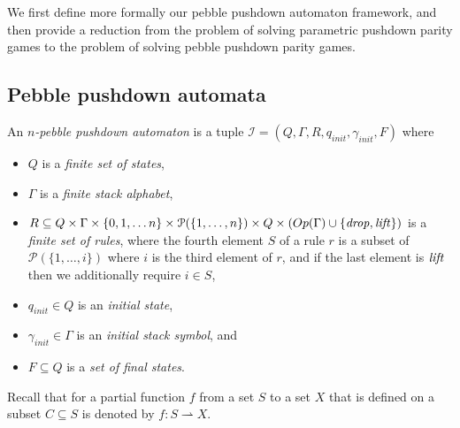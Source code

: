 \documentclass[a4paper,UKenglish,cleveref, autoref, thm-restate]{lipics-v2021}
\newcommand\mh[1]{\todo[inline,size=\scriptsize]{#1 - \textbf{Mathieu}}}
\newcommand{\Op}{\mathsf{Op}}
\begin{document}
We first define more formally our pebble pushdown automaton framework, and then provide a reduction from the problem of solving parametric pushdown parity games to the problem of solving pebble pushdown parity games.



\subsection{Pebble pushdown automata}

\newcommand{\ppda}{\mathcal{I}}

An {\em $n$-pebble pushdown automaton} 
is a tuple 
$\ppda = (Q, \Gamma,  R, q_{init}, \gamma_{init}, F)$
where
\begin{itemize}
\item $Q$ is a {\em finite set of  states},
\item $\Gamma$ is a {\em finite stack alphabet},
\item  $R  \subseteq  Q  \times \Gamma \times
		 \{ 0, 1, \ldots n\} \times \mathcal{P}(\{1,\ldots,n\})
		 \times Q  \times (\Op(\Gamma) \cup \{\text{\textit{drop}}, \text{\textit{lift}}\})$ is a {\em finite set of rules},
		 where the fourth element $S$ of a rule $r$ is a subset of 
		$\mathcal{P}(\{1,\ldots,i\})$ where $i$ is the third element of $r$,
		and if the last element is
		$\text{\textit{lift}}$ then we additionally require $i \in S$,
\item $q_{init} \in Q$ is an {\em initial  state}, 
\item $\gamma_{init} \in \Gamma$ is an {\em initial stack symbol}, and
\item $F \subseteq Q$ is a {\em set of final  states}.
\end{itemize}

 
 
\par\noindent\ignorespacesafterend 
Recall that for \iffalse a partial function $f$ from a set $S$ to a set $X$ 
that is defined on a subset $C \subseteq S$
is denoted by
$ f : S \rightharpoonup X $.
\end{document}
